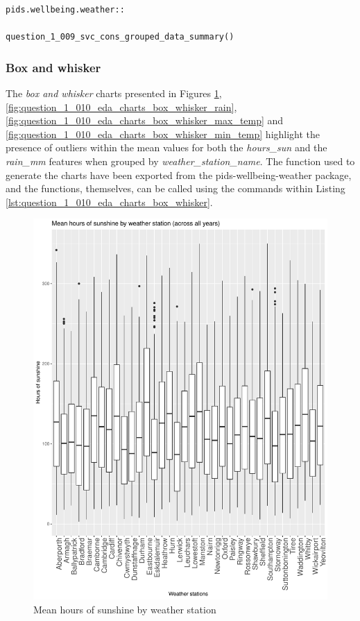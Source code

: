 \documentclass[12pt, oneside, openany]{book}
\begin{document}
\bigskip
\begin{lstlisting}
pids.wellbeing.weather::

question_1_009_svc_cons_grouped_data_summary()
\end{lstlisting}

\newpage
\subsubsection*{Box and whisker}

The \emph{box and whisker} charts presented in Figures \ref{fig:question_1_010_eda_charts_box_whisker_hours_sun},  \ref{fig:question_1_010_eda_charts_box_whisker_rain}, \ref{fig:question_1_010_eda_charts_box_whisker_max_temp} and \ref{fig:question_1_010_eda_charts_box_whisker_min_temp} highlight the presence of outliers within the mean values for both the \emph{hours\_sun} and the \emph{rain\_mm} features when grouped by \emph{weather\_station\_name}. The function used to generate the charts have been exported from the pids-wellbeing-weather package, and the functions, themselves, can be called using the commands within Listing \ref{lst:question_1_010_eda_charts_box_whisker}.

\begin{figure}
	\centering
	\captionsetup{justification=centering}
	\includegraphics[scale=0.7]{question_1_010_eda_charts_box_whisker_hours_sun}
	\caption{Mean hours of sunshine by weather station}
	\label{fig:question_1_010_eda_charts_box_whisker_hours_sun}
\end{figure}
\end{document}
